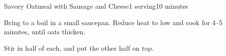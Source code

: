 \documentclass[../Cookbook.tex]{subfiles}
\begin{document}
\begin{recipe}{Savory Oatmeal with Sausage and Cheese}{1 serving}{10 minutes}

Bring to a boil in a small saucepan. Reduce heat to low and cook for 4--5 minutes, until oats thicken.

Stir in half of each, and put the other half on top.

\end{recipe}
\end{document}
